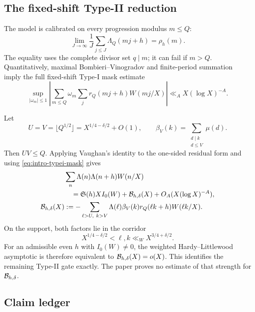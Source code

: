 \subsection{The fixed-shift Type-II reduction}

The model is calibrated on every progression modulus $m\leq Q$:
\begin{equation}
 \lim_{J\to\infty}\frac1J\sum_{j\leq J}\Lambda_Q(mj+h)
 =\rho_h(m).
 \label{eq:intro-progression-calibration}
\end{equation}
The equality uses the complete divisor set $q\mid m$; it can fail if
$m>Q$.  Quantitatively, maximal Bombieri--Vinogradov and finite-period
summation imply the full fixed-shift Type-I mask estimate
\begin{equation}
 \sup_{|\omega_m|\leq1}
 \left|
 \sum_{m\leq Q}\omega_m
 \sum_jr_Q(mj+h)W(mj/X)
 \right|
 \ll_A X(\log X)^{-A}.
 \label{eq:intro-typei-mask}
\end{equation}

Let
\begin{equation}
 U=V=\lfloor Q^{1/2}\rfloor
 =X^{1/4-\delta/2}+O(1),
 \qquad
 \beta_V(k)=\sum_{\substack{d\mid k\\d\leq V}}\mu(d).
 \label{eq:intro-Vaughan-parameters}
\end{equation}
Then $UV\leq Q$.  Applying
Vaughan's identity to the one-sided residual form and using
\eqref{eq:intro-typei-mask} gives
\begin{align}
 &\sum_n\Lambda(n)\Lambda(n+h)W(n/X)
 \notag\\
 &\quad=\mathfrak S(h)XI_0(W)+\mathcal B_{h,\delta}(X)
 +O_A(X(\log X)^{-A}),
 \label{eq:intro-hard-reduction}\\
 \mathcal B_{h,\delta}(X)
 &:=-\sum_{\substack{\ell>U,\ k>V}}
 \Lambda(\ell)\beta_V(k)r_Q(\ell k+h)W(\ell k/X).
 \label{eq:intro-hard-packet}
\end{align}
On the support, both factors lie in the corridor
\begin{equation}
 X^{1/4-\delta/2}<\ell,k\ll_WX^{3/4+\delta/2}.
 \label{eq:intro-hard-corridor}
\end{equation}
For an admissible even $h$ with $I_0(W)\ne0$, the weighted
Hardy--Littlewood asymptotic is therefore equivalent to
$\mathcal B_{h,\delta}(X)=o(X)$.  This identifies the
remaining Type-II gate exactly.  The paper proves no estimate of that
strength for $\mathcal B_{h,\delta}$.

\subsection{Claim ledger}

